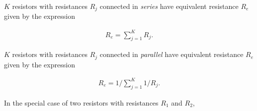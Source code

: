 \documentclass[electronics.tex]{subfiles}
\begin{document}
$K$ resistors with resistances $R_j$ connected in \emph{series} have equivalent resistance $R_e$ given by the expression
\tags{}

\begin{align}
  R_e = \sum_{j=1}^K R_j.
\end{align}

$K$ resistors with resistances $R_j$ connected in \emph{parallel} have equivalent resistance $R_e$ given by the expression
\tags{}

\begin{align}
  R_e = 1/\sum_{j=1}^K 1/R_j.
\end{align}

In the special case of two resistors with resistances $R_1$ and $R_2$,
\end{document}
